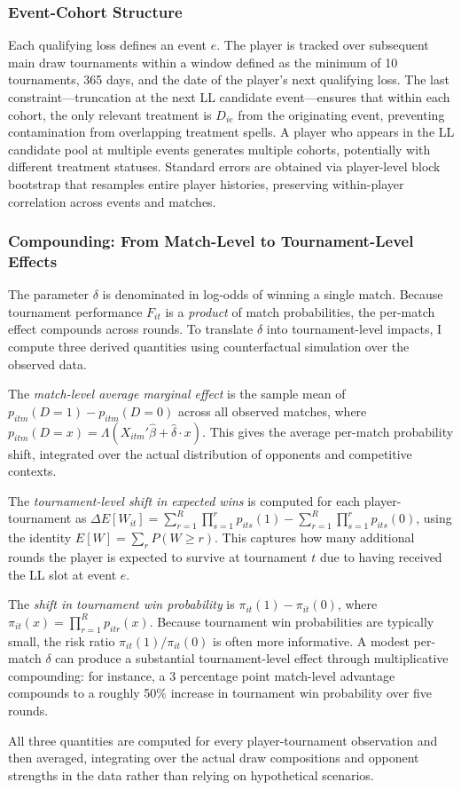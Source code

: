 \subsubsection{Event-Cohort Structure}

Each qualifying loss defines an event $e$. The player is tracked over subsequent main draw tournaments within a window defined as the minimum of 10 tournaments, 365 days, and the date of the player's next qualifying loss. The last constraint---truncation at the next LL candidate event---ensures that within each cohort, the only relevant treatment is $D_{ie}$ from the originating event, preventing contamination from overlapping treatment spells. A player who appears in the LL candidate pool at multiple events generates multiple cohorts, potentially with different treatment statuses. Standard errors are obtained via player-level block bootstrap that resamples entire player histories, preserving within-player correlation across events and matches.

\subsubsection{Compounding: From Match-Level to Tournament-Level Effects}

The parameter $\delta$ is denominated in log-odds of winning a single match. Because tournament performance $F_{it}$ is a \textit{product} of match probabilities, the per-match effect compounds across rounds. To translate $\delta$ into tournament-level impacts, I compute three derived quantities using counterfactual simulation over the observed data.

The \textit{match-level average marginal effect} is the sample mean of $p_{itm}(D=1) - p_{itm}(D=0)$ across all observed matches, where $p_{itm}(D=x) = \Lambda(X_{itm}'\hat{\beta} + \hat{\delta} \cdot x)$. This gives the average per-match probability shift, integrated over the actual distribution of opponents and competitive contexts.

The \textit{tournament-level shift in expected wins} is computed for each player-tournament as $\Delta E[W_{it}] = \sum_{r=1}^{R}\prod_{s=1}^{r} p_{its}(1) - \sum_{r=1}^{R}\prod_{s=1}^{r} p_{its}(0)$, using the identity $E[W] = \sum_r P(W \geq r)$. This captures how many additional rounds the player is expected to survive at tournament $t$ due to having received the LL slot at event $e$.

The \textit{shift in tournament win probability} is $\pi_{it}(1) - \pi_{it}(0)$, where $\pi_{it}(x) = \prod_{r=1}^{R} p_{itr}(x)$. Because tournament win probabilities are typically small, the risk ratio $\pi_{it}(1)/\pi_{it}(0)$ is often more informative. A modest per-match $\delta$ can produce a substantial tournament-level effect through multiplicative compounding: for instance, a 3 percentage point match-level advantage compounds to a roughly 50\% increase in tournament win probability over five rounds.

All three quantities are computed for every player-tournament observation and then averaged, integrating over the actual draw compositions and opponent strengths in the data rather than relying on hypothetical scenarios.
